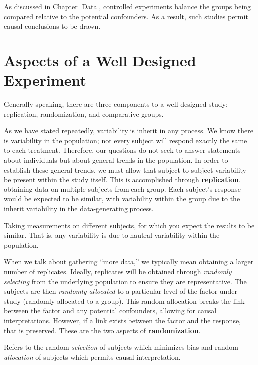 \documentclass[]{book}
\theoremstyle{definition}
\theoremstyle{definition}
\theoremstyle{definition}
\theoremstyle{remark}
\let\BeginKnitrBlock\begin \let\EndKnitrBlock\end
\begin{document}
As discussed in Chapter \ref{Data}, controlled experiments balance the
groups being compared relative to the potential confounders. As a
result, such studies permit causal conclusions to be drawn.

\section{Aspects of a Well Designed
Experiment}\label{aspects-of-a-well-designed-experiment}

Generally speaking, there are three components to a well-designed study:
replication, randomization, and comparative groups.

As we have stated repeatedly, variability is inherit in any process. We
know there is variability in the population; not every subject will
respond exactly the same to each treatment. Therefore, our questions do
not seek to answer statements about individuals but about general trends
in the population. In order to establish these general trends, we must
allow that subject-to-subject variability be present within the study
itself. This is accomplished through \textbf{replication}, obtaining
data on multiple subjects from each group. Each subject's response would
be expected to be similar, with variability within the group due to the
inherit variability in the data-generating process.

\BeginKnitrBlock{definition}[Replication]
\protect\hypertarget{def:defn-replication}{}{\label{def:defn-replication}
{} }Taking measurements on different subjects,
for which you expect the results to be similar. That is, any variability
is due to nautral variability within the population.
\EndKnitrBlock{definition}

When we talk about gathering ``more data,'' we typically mean obtaining
a larger number of replicates. Ideally, replicates will be obtained
through \emph{randomly selecting} from the underlying population to
ensure they are representative. The subjects are then \emph{randomly
allocated} to a particular level of the factor under study (randomly
allocated to a group). This random allocation breaks the link between
the factor and any potential confounders, allowing for causal
interpretations. However, if a link exists between the factor and the
response, that is preserved. These are the two aspects of
\textbf{randomization}.

\BeginKnitrBlock{definition}[Randomization]
\protect\hypertarget{def:defn-randomization}{}{\label{def:defn-randomization}
{} }Refers to the random \emph{selection} of
subjects which minimizes bias and random \emph{allocation} of subjects
which permits causal interpretation.
\EndKnitrBlock{definition}
\end{document}
